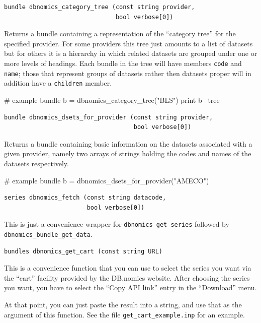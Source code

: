 \documentclass{article}
\begin{document}
\begin{funcdoc}
\begin{verbatim}
bundle dbnomics_category_tree (const string provider,
                               bool verbose[0])
\end{verbatim}
  Returns a bundle containing a representation of the ``category
  tree'' for the specified provider. For some providers this tree just
  amounts to a list of datasets but for others it is a hierarchy in
  which related datasets are grouped under one or more levels of
  headings. Each bundle in the tree will have members \texttt{code}
  and \texttt{name}; those that represent groups of datasets rather
  then datasets proper will in addition have a \texttt{children}
  member.
\begin{code}
# example
bundle b = dbnomics_category_tree("BLS")
print b --tree
\end{code}
\end{funcdoc}

\begin{funcdoc}
\begin{verbatim}
bundle dbnomics_dsets_for_provider (const string provider,
                                    bool verbose[0])
\end{verbatim}
  Returns a bundle containing basic information on the datasets
  associated with a given provider, namely two arrays of strings
  holding the codes and names of the datasets respectively.
\begin{code}
# example
bundle b = dbnomics_dsets_for_provider("AMECO")
\end{code}
\end{funcdoc}

\begin{funcdoc}
\begin{verbatim}
series dbnomics_fetch (const string datacode,
                       bool verbose[0])
\end{verbatim}
  This is just a convenience wrapper for
  \texttt{dbnomics\_get\_series} followed by
  \texttt{dbnomics\_bundle\_get\_data}.
\end{funcdoc}

\begin{funcdoc}
\begin{verbatim}
bundles dbnomics_get_cart (const string URL)
\end{verbatim}
This is a convenience function that you can use to select the series
you want via the ``cart'' facility provided by the DB.nomics website.
After choosing the series you want, you have to select the ``Copy API
link'' entry in the ``Download'' menu.

At that point, you can just paste the result into a 
string, and use that as the argument of this function. See the
file \texttt{get\_cart\_example.inp} for an example.
\end{funcdoc}
\end{document}
